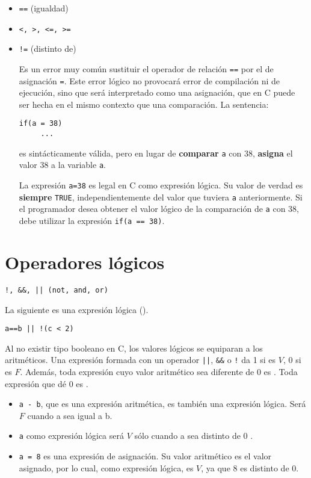 \begin{itemize}
\item \lstinline{==} (igualdad)
\item \lstinline{<, >, <=, >=}
\item \lstinline{!=} (distinto de)

Es un error muy común sustituir el operador de relación \lstinline{==} por el de asignación \lstinline{=}. Este error lógico no provocará error de compilación ni de ejecución, sino que será interpretado como una asignación, que en C puede ser hecha en el mismo contexto que una comparación. La sentencia:
\begin{lstlisting}
if(a = 38)
     ...
\end{lstlisting}     
es sintácticamente válida, pero en lugar de \textbf{comparar} \lstinline{a} con 38, \textbf{asigna} el valor 38 a la variable \lstinline{a}. 

La expresión \lstinline{a=38} es legal en C como expresión lógica. Su valor de verdad es \textbf{siempre} \lstinline{TRUE}, independientemente del valor que tuviera \lstinline{a} anteriormente. Si el programador desea obtener el valor lógico de la comparación de \lstinline{a} con 38, debe utilizar la expresión \lstinline{if(a == 38)}.
\end{itemize}


\section{Operadores lógicos}
\begin{lstlisting}
!, &&, || (not, and, or)	
\end{lstlisting}

\begin{ejemplo}
La siguiente es una expresión lógica ().
\begin{lstlisting}
a==b || !(c < 2)    
\end{lstlisting}
\end{ejemplo}

Al no existir tipo booleano en C, los valores lógicos se equiparan a los aritméticos. Una expresión formada con un operador \lstinline{||}, \lstinline{&&} o \lstinline{!} da 1 si es $V$, 0 si es $F$. Además, toda expresión cuyo valor aritmético sea diferente de 0 es . Toda expresión que dé 0 es .

\begin{ejemplo}
\noindent
\begin{itemize}
	\item \lstinline{a - b}, que es una expresión aritmética, es también una expresión lógica. Será $F$ cuando a sea igual a b.
\item \lstinline{a} como expresión lógica será $V$ sólo cuando a sea distinto de 0 .

\item \lstinline{a = 8} es una expresión de asignación. Su valor aritmético es el valor asignado, por lo cual, como expresión lógica, es $V$, ya que 8 es distinto de 0.

\end{itemize}
\end{ejemplo}

